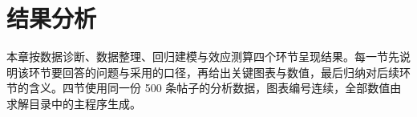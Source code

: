 \section{结果分析}

本章按数据诊断、数据整理、回归建模与效应测算四个环节呈现结果。每一节先说明该环节要回答的问题与采用的口径，再给出关键图表与数值，最后归纳对后续环节的含义。四节使用同一份 500 条帖子的分析数据，图表编号连续，全部数值由求解目录中的主程序生成。





